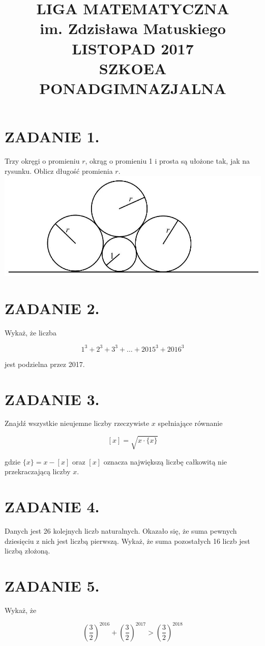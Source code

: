 \documentclass[10pt]{article}
\title{LIGA MATEMATYCZNA \\
 im. Zdzisława Matuskiego \\
 LISTOPAD 2017 \\
 SZKOEA PONADGIMNAZJALNA }
\author{}
\date{}
\begin{document}
\maketitle
\section*{ZADANIE 1.}
Trzy okręgi o promieniu \(r\), okrąg o promieniu 1 i prosta są ułożone tak, jak na rysunku. Oblicz długość promienia \(r\).\\
\includegraphics[max width=\textwidth, center]{2024_11_21_0fb85abfa2f5513ee193g-1}

\section*{ZADANIE 2.}
Wykaż, że liczba

\[
1^{3}+2^{3}+3^{3}+\ldots+2015^{3}+2016^{3}
\]

jest podzielna przez 2017.

\section*{ZADANIE 3.}
Znajdź wszystkie nieujemne liczby rzeczywiste \(x\) spełniające równanie

\[
[x]=\sqrt{x \cdot\{x\}}
\]

gdzie \(\{x\}=x-[x]\) oraz \([x]\) oznacza największą liczbę całkowitą nie przekraczającą liczby \(x\).

\section*{ZADANIE 4.}
Danych jest 26 kolejnych liczb naturalnych. Okazało się, że suma pewnych dziesięciu z nich jest liczbą pierwszą. Wykaż, że suma pozostałych 16 liczb jest liczbą złożoną.

\section*{ZADANIE 5.}
Wykaż, że

\[
\left(\frac{3}{2}\right)^{2016}+\left(\frac{3}{2}\right)^{2017}>\left(\frac{3}{2}\right)^{2018}
\]
\end{document}

